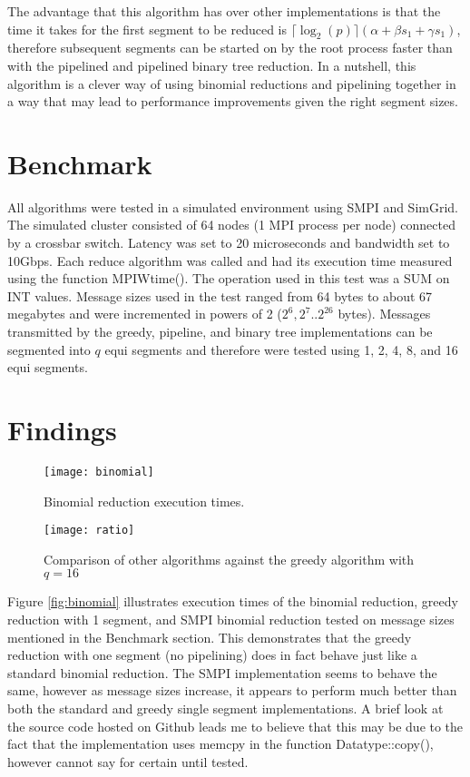 \documentclass{article}
\begin{document}
The advantage that this algorithm has over other implementations is that the time it takes for the
first segment to be reduced is $\lceil \log_2(p) \rceil (\alpha + \beta s_1+ \gamma s_1)$, therefore subsequent segments can be started on by
the root process faster than with the pipelined and pipelined binary tree reduction. In a nutshell, this
algorithm is a clever way of using binomial reductions and pipelining together in a way that may lead to
performance improvements given the right segment sizes.

\section{Benchmark}

All algorithms were tested in a simulated environment using SMPI and SimGrid. The simulated
cluster consisted of 64 nodes (1 MPI process per node) connected by a crossbar switch. Latency was set to
20 microseconds and bandwidth set to 10Gbps. Each reduce algorithm was called and had its execution
time measured using the function MPIWtime(). The operation used in this test was a SUM on INT
values. Message sizes used in the test ranged from 64 bytes to about 67 megabytes and were incremented
in powers of 2 ($2^6, 2^7 .. 2^{26}$ bytes). Messages transmitted by the greedy, pipeline, and binary tree
implementations can be segmented into $q$ equi segments and therefore were tested using 1, 2, 4, 8, and 16
equi segments.

\section{Findings}

\begin{figure}[h]
    \centering
    \begin{minipage}{0.5\textwidth}
	    \texttt{[image: binomial]}
	    \caption{Binomial reduction execution times.}
	    \label{fig:binomial}
    \end{minipage}%
    \centering
    \begin{minipage}{0.5\textwidth}
	    \texttt{[image: ratio]}
	    \caption{Comparison of other algorithms against the greedy algorithm with $q=16$}
	    \label{fig:ratio}
    \end{minipage}%
\end{figure}


Figure \ref{fig:binomial} illustrates execution times of the binomial reduction, greedy reduction with
1 segment, and SMPI binomial reduction tested on message sizes mentioned in the Benchmark section.
This demonstrates that the greedy reduction with one segment (no pipelining) does in fact behave just like
a standard binomial reduction. The SMPI implementation seems to behave the same, however as message
sizes increase, it appears to perform much better than both the standard and greedy single segment
implementations. A brief look at the source code hosted on Github leads me to believe that this may be
due to the fact that the implementation uses memcpy in the function Datatype::copy(), however cannot
say for certain until tested. \\
\end{document}
